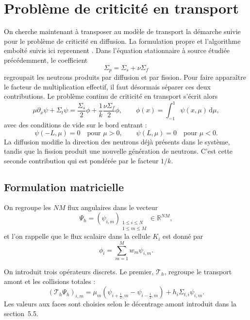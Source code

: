 \documentclass{article}
\begin{document}
\section {Problème de criticité en transport}
\label{subsec:criticite-transport}

On cherche maintenant à transposer au modèle de transport la démarche suivie pour le problème de criticité en diffusion. La formulation propre et l'algorithme emboîté suivis ici reprennent \cite[chap.~6, sections~6.5.2 et~6.6.3]{Allaire2018}. Dans l'équation stationnaire à source étudiée précédemment, le coefficient
\[
    \Sigma_p=\Sigma_s+\nu\Sigma_f
\]
regroupait les neutrons produits par diffusion et par fission. Pour faire apparaître le facteur de multiplication effectif, il faut désormais séparer ces deux contributions. Le problème continu de criticité en transport s'écrit alors
\begin{equation}
    \mu\partial_x\psi + \Sigma_t\psi
    = \frac{\Sigma_s}{2}\phi + \frac{1}{k}\frac{\nu\Sigma_f}{2}\phi,
    \qquad \phi(x)=\int_{-1}^{1}\psi(x,\mu)\,\mathrm{d}\mu,
    \label{eq:criticite-transport-continue}
\end{equation}
avec des conditions de vide sur le bord entrant :
\[
    \psi(-L,\mu)=0 \quad \text{pour }\mu>0,  \qquad   \psi(L,\mu)=0 \quad \text{pour }\mu<0.
\]
La diffusion modifie la direction des neutrons déjà présents dans le système, tandis que la fission produit une nouvelle génération de neutrons. C'est cette seconde contribution qui est pondérée par le
facteur $1/k$.

\subsection {Formulation matricielle}

On regroupe les $NM$ flux angulaires dans le vecteur
\[
    \Psi_h = \left( \psi_{i,m} \right)_{\substack{1\leq i\leq N\\1\leq m\leq M}}
    \in\mathbb{R}^{NM},
\]
et l'on rappelle que le flux scalaire dans la cellule $K_i$ est donné
par
\[
    \phi_i = \sum_{m=1}^{M}w_m\psi_{i,m}.
\]

On introduit trois opérateurs discrets. Le premier,
$\mathcal T_h$, regroupe le transport amont et les collisions totales :
\begin{equation}
    \left( \mathcal T_h\Psi_h \right)_{i,m} =
    \mu_m \left(\psi_{i+\frac12,m} - \psi_{i-\frac12,m} \right)
    + h_i\Sigma_{t,i}\psi_{i,m}.
    \label{eq:operateur-transport-discret}
\end{equation}
Les valeurs aux faces sont choisies selon le décentrage amont introduit
dans la section~5.5.
\end{document}

